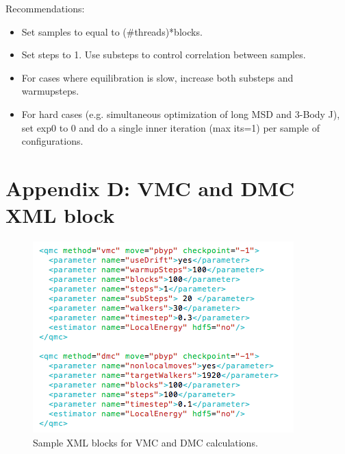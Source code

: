 Recommendations:
\begin{itemize}
  \item{Set samples to equal to (\#threads)*blocks.}
  \item{Set steps to 1. Use substeps to control correlation between samples.}
  \item{For cases where equilibration is slow, increase both substeps and warmupsteps.}
  \item{For hard cases (e.g. simultaneous optimization of long MSD and 3-Body J), set exp0
to 0 and do a single inner iteration (max its=1) per sample of configurations.}
\end{itemize}


\newpage
\section{Appendix D: VMC and DMC XML block}

\begin{figure}[ht!]
\begin{center}
\includegraphics[trim = 0mm 0mm 0mm 0mm, clip,width=0.75\columnwidth]{figures/lab_advanced_molecules_xml_vmc_dmc.png}
\end{center}
\caption{Sample XML blocks for VMC and DMC calculations.}
\label{fig:lam_xml_vmc_dmc}
\end{figure}

